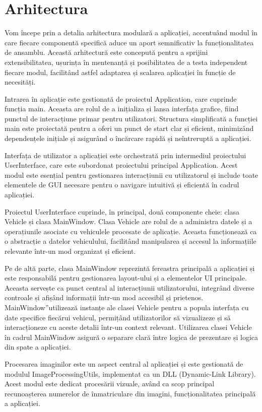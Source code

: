 \documentclass[a4paper,12pt]{report}
\begin{document}
\section{Arhitectura}
Vom începe prin a detalia arhitectura modulară a aplicației, accentuând modul în care fiecare componentă specifică aduce un aport semnificativ la funcționalitatea de ansamblu. Această arhitectură este concepută pentru a sprijini extensibilitatea, ușurința în mentenanță și posibilitatea de a testa independent fiecare modul, facilitând astfel adaptarea și scalarea aplicației în funcție de necesități.

Intrarea în aplicație este gestionată de proiectul Application, care cuprinde funcția main. Aceasta are rolul de a inițializa și lansa interfața grafice, fiind punctul de interacțiune primar pentru utilizatori. Structura simplificată a funcției main este proiectată pentru a oferi un punct de start clar și eficient, minimizând dependențele inițiale și asigurând o încărcare rapidă și neîntreruptă a aplicației.

Interfața de utilizator a aplicației este orchestrată prin intermediul proiectului UserInterface, care este subordonat proiectului principal Application. Acest modul este esențial pentru gestionarea interacțiunii cu utilizatorul și include toate elementele de GUI necesare pentru o navigare intuitivă și eficientă în cadrul aplicației.

Proiectul UserInterface cuprinde, în principal, două componente cheie: clasa Vehicle și clasa MainWindow. Clasa Vehicle are rolul de a administra datele și a operațiunile asociate cu vehiculele procesate de aplicație. Aceasta funcționează ca o abstracție a datelor vehiculului, facilitând manipularea și accesul la informațiile relevante într-un mod organizat și eficient.

Pe de altă parte, clasa MainWindow reprezintă fereastra principală a aplicației și este responsabilă pentru gestionarea layout-ului și a elementelor UI principale. Aceasta servește ca punct central al interacțiunii utilizatorului, integrând diverse controale și afișând informații într-un mod accesibil și prietenos. MainWindow”utilizează instanțe ale clasei Vehicle pentru a popula interfața cu date specifice fiecărui vehicul, permițând utilizatorilor să vizualizeze și să interacționeze cu aceste detalii într-un context relevant. Utilizarea clasei Vehicle în cadrul MainWindow asigură o separare clară între logica de prezentare și logica din spate a aplicației.

Procesarea imaginilor este un aspect central al aplicației și este gestionată de modulul ImageProcessingUtils, implementat ca un DLL (Dynamic-Link Library). Acest modul este dedicat procesării vizuale, având ca scop principal recunoașterea numerelor de înmatriculare din imagini, funcționalitatea principală a aplicației.
\end{document}
